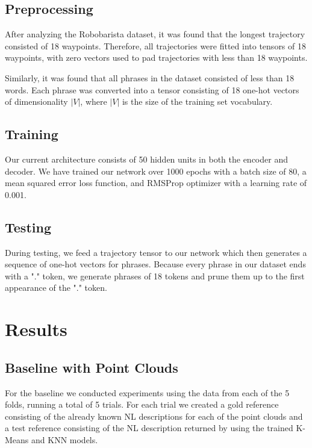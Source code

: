 \documentclass[letterpaper, 12 pt, conference]{ieeeconf}
\begin{document}
\subsection{Preprocessing}
After analyzing the Robobarista dataset, it was found  that the longest trajectory consisted of 18 waypoints. Therefore, all trajectories were fitted into tensors of 18 waypoints, with zero vectors used to pad trajectories with less than 18 waypoints. 
\par
Similarly, it was found that all phrases in the dataset consisted of less than 18 words. Each phrase was converted into a tensor consisting of 18 one-hot vectors of dimensionality $|V|$, where $|V|$ is the size of the training set vocabulary.

\subsection{Training}

Our current architecture consists of 50 hidden units in both the encoder and decoder. We have trained our network over 1000 epochs with a batch size of 80, a mean squared error loss function, and RMSProp optimizer with a learning rate of 0.001. 

\subsection{Testing}

During testing, we feed a trajectory tensor to our network which then generates a sequence of one-hot vectors for phrases. Because every phrase in our dataset ends with a "." token, we generate phrases of 18 tokens and prune them up to the first appearance of the "." token.  


\section{Results}

\subsection{Baseline with Point Clouds}

For the baseline we conducted experiments using the data from each of the 5 folds, running a total of 5 trials. For each trial we created a gold reference consisting of the already known NL descriptions for each of the point clouds and a test reference consisting of the NL description returned by using the trained K-Means and KNN models.
\end{document}
